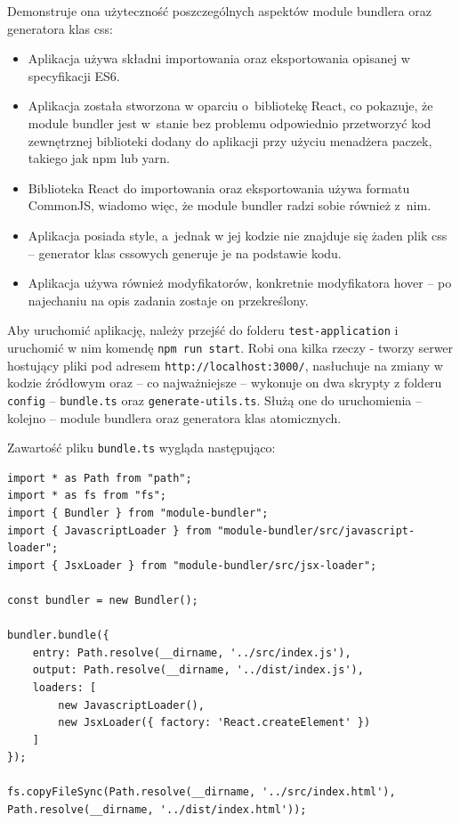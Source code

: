 \documentclass{SGGW-thesis}
\begin{document}
Demonstruje ona użyteczność poszczególnych aspektów module bundlera oraz generatora klas css:
\begin{itemize}
    \item Aplikacja używa składni importowania oraz eksportowania opisanej w specyfikacji ES6.
    \item Aplikacja została stworzona w oparciu o~bibliotekę React, co pokazuje, że module bundler jest w~stanie bez problemu odpowiednio przetworzyć kod zewnętrznej biblioteki dodany do aplikacji przy użyciu menadżera paczek, takiego jak npm lub yarn.
    \item Biblioteka React do importowania oraz eksportowania używa formatu CommonJS, wiadomo więc, że module bundler radzi sobie również z~nim.
    \item Aplikacja posiada style, a~jednak w jej kodzie nie znajduje się żaden plik css -- generator klas cssowych generuje je na podstawie kodu.
    \item Aplikacja używa również modyfikatorów, konkretnie modyfikatora hover -- po najechaniu na opis zadania zostaje on przekreślony.
\end{itemize}

Aby uruchomić aplikację, należy przejść do folderu \verb|test-application| i uruchomić w nim komendę \verb|npm run start|. Robi ona kilka rzeczy - tworzy serwer hostujący pliki pod adresem \verb|http://localhost:3000/|, nasłuchuje na zmiany w kodzie źródłowym oraz -- co najważniejsze -- wykonuje on dwa skrypty z folderu \verb|config| -- \verb|bundle.ts| oraz \verb|generate-utils.ts|. Służą one do uruchomienia -- kolejno -- module bundlera oraz generatora klas atomicznych.

Zawartość pliku \verb|bundle.ts| wygląda następująco:

\begin{verbatim}
import * as Path from "path";
import * as fs from "fs";
import { Bundler } from "module-bundler";
import { JavascriptLoader } from "module-bundler/src/javascript-loader";
import { JsxLoader } from "module-bundler/src/jsx-loader";

const bundler = new Bundler();

bundler.bundle({
	entry: Path.resolve(__dirname, '../src/index.js'),
	output: Path.resolve(__dirname, '../dist/index.js'),
	loaders: [
		new JavascriptLoader(),
		new JsxLoader({ factory: 'React.createElement' })
	]
});

fs.copyFileSync(Path.resolve(__dirname, '../src/index.html'), Path.resolve(__dirname, '../dist/index.html'));
\end{verbatim}
\end{document}
